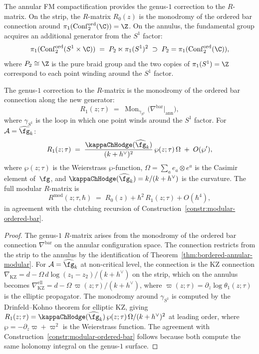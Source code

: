 The annular FM compactification provides the genus-$1$ correction
to the $R$-matrix. On the strip, the $R$-matrix
$R_0(z)$ is the monodromy of the ordered bar connection around
$\pi_1(\Conf_2^{\mathrm{ord}}(\C)) = \Z$. On the annulus, the
fundamental group acquires an additional generator from the
$S^1$ factor:
\[
\pi_1(\Conf_2^{\mathrm{ord}}(S^1 \times \C))
\;=\;
P_2 \ltimes \pi_1(S^1)^2
\;\supset\;
P_2 = \pi_1(\Conf_2^{\mathrm{ord}}(\C)),
\]
where $P_2 \cong \Z$ is the pure braid group and the two copies
of $\pi_1(S^1) = \Z$ correspond to each point winding around
the $S^1$ factor.

\begin{theorem}
\label{thm:genus1-R-matrix}
The genus-$1$ correction to the $R$-matrix is the monodromy of
the ordered bar connection along the new generator:
\[
R_1(z;\tau)
\;=\;
\operatorname{Mon}_{\gamma_{S^1}}
\bigl(\nabla^{\mathrm{bar}}\big|_{\mathrm{ann}}\bigr),
\]
where $\gamma_{S^1}$ is the loop in which one point winds around
the $S^1$ factor. For $\cA = \widehat{\fg}_k$:
\[
R_1(z;\tau)
\;=\;
\frac{\kappaChHodge(\widehat{\fg}_k)}{(k+h^\vee)^2}\,
\wp(z;\tau)\,\Omega
\;+\;
O(\wp'),
\]
where $\wp(z;\tau)$ is the Weierstrass $\wp$-function,
$\Omega = \sum_a e_a \otimes e^a$ is the Casimir element
of~$\fg$, and $\kappaChHodge(\widehat{\fg}_k) = k/(k+h^\vee)$ is the
curvature. The full modular $R$-matrix is
\[
R^{\mathrm{mod}}(z;\tau,\hbar)
\;=\;
R_0(z) + \hbar^2\, R_1(z;\tau) + O(\hbar^4),
\]
in agreement with the clutching recursion of
Construction~\ref{constr:modular-ordered-bar}.
\end{theorem}

\begin{proof}
The genus-$1$ $R$-matrix arises from the monodromy of
the ordered bar connection $\nabla^{\mathrm{bar}}$ on the
annular configuration space. The connection restricts from the
strip to the annulus by the identification of
Theorem~\ref{thm:bordered-annular-modular}. For
$\cA = \widehat{\fg}_k$ at non-critical level, the connection
is the KZ connection
$\nabla_{\mathrm{KZ}} = d - \Omega\, d\log(z_1 - z_2)/(k + h^\vee)$
on the strip, which on the annulus becomes
$\nabla_{\mathrm{KZ}}^{\mathrm{ell}} = d - \Omega\, \varpi(z;\tau)/(k + h^\vee)$,
where $\varpi(z;\tau) = \partial_z \log \theta_1(z;\tau)$
is the elliptic propagator. The monodromy around
$\gamma_{S^1}$ is computed by the Drinfeld--Kohno theorem
for elliptic KZ, giving
$R_1(z;\tau) = \kappaChHodge(\widehat{\fg}_k)\, \wp(z;\tau)\, \Omega / (k + h^\vee)^2$
at leading order, where $\wp = -\partial_z \varpi + \varpi^2$
is the Weierstrass function. The agreement with
Construction~\ref{constr:modular-ordered-bar} follows because
both compute the same holonomy integral on the genus-$1$ surface.
\end{proof}

